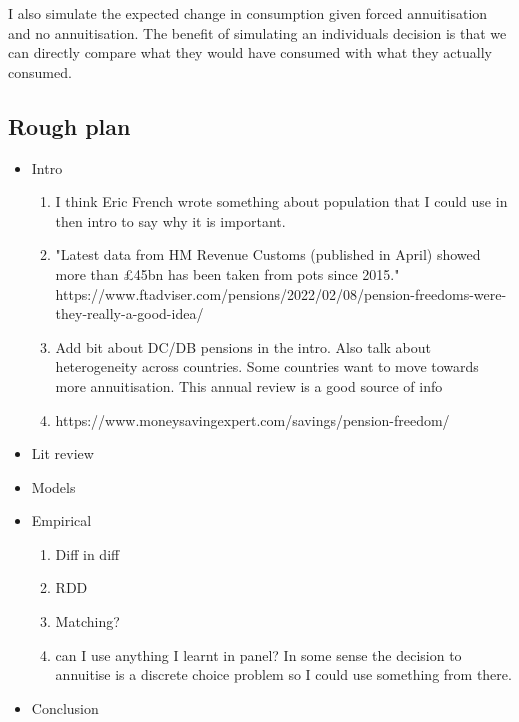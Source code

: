 \documentclass[12pt]{article}
\begin{document}
I also simulate the expected change in consumption given forced annuitisation and no annuitisation.
The benefit of simulating an individuals decision is that we can directly compare what they would have
consumed with what they actually consumed.

\subsection{Rough plan}
\begin{itemize}
  \item Intro
        \begin{enumerate}
          \item I think Eric French wrote something about population that I could use in then intro to say why it is important.
          \item "Latest data from HM Revenue Customs (published in April) showed more than £45bn has been taken from pots since 2015."
                https://www.ftadviser.com/pensions/2022/02/08/pension-freedoms-were-they-really-a-good-idea/


          \item Add bit about DC/DB pensions in the intro. Also talk about heterogeneity across countries.
                Some countries want to move towards more annuitisation. This annual review is a good source of info
                \cite{banks_crawford_ar_2022}
          \item https://www.moneysavingexpert.com/savings/pension-freedom/
        \end{enumerate}
  \item Lit review
  \item Models
  \item Empirical
        \begin{enumerate}
          \item Diff in diff
          \item RDD
          \item Matching?
          \item can I use anything I learnt in panel?
                In some sense the decision to annuitise is a discrete choice problem so I could use something from there.
        \end{enumerate}
  \item Conclusion
\end{itemize}




\end{document}
